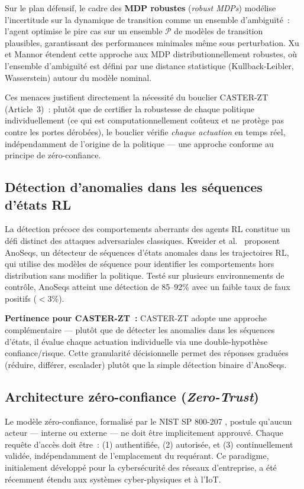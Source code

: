 Sur le plan défensif, le cadre des \textbf{MDP robustes} (\emph{robust MDPs}) \cite{Iyengar2005RobustMDP} modélise l'incertitude sur la dynamique de transition comme un ensemble d'ambiguïté~: l'agent optimise le pire cas sur un ensemble $\mathcal{P}$ de modèles de transition plausibles, garantissant des performances minimales même sous perturbation. Xu et Mannor \cite{Xu2010DistRobustMDP} étendent cette approche aux MDP distributionnellement robustes, où l'ensemble d'ambiguïté est défini par une distance statistique (Kullback-Leibler, Wasserstein) autour du modèle nominal.

Ces menaces justifient directement la nécessité du bouclier CASTER-ZT (Article~3)~: plutôt que de certifier la robustesse de chaque politique individuellement (ce qui est computationnellement coûteux et ne protège pas contre les portes dérobées), le bouclier vérifie \emph{chaque actuation} en temps réel, indépendamment de l'origine de la politique --- une approche conforme au principe de zéro-confiance.

\subsection{Détection d'anomalies dans les séquences d'états RL}\label{sec:revlit-anomaly}

La détection précoce des comportements aberrants des agents RL constitue un défi distinct des attaques adversariales classiques.
Kweider et al.~\cite{anoseqs2024} proposent AnoSeqs, un détecteur de séquences d'états anomales dans les trajectoires RL, qui utilise des modèles de séquence pour identifier les comportements hors distribution sans modifier la politique. Testé sur plusieurs environnements de contrôle, AnoSeqs atteint une détection de 85--92\% avec un faible taux de faux positifs ($<$3\%).

\textbf{Pertinence pour CASTER-ZT~:} CASTER-ZT adopte une approche complémentaire --- plutôt que de détecter les anomalies dans les séquences d'états, il évalue chaque actuation individuelle via une double-hypothèse confiance/risque. Cette granularité décisionnelle permet des réponses graduées (réduire, différer, escalader) plutôt que la simple détection binaire d'AnoSeqs.

\subsection{Architecture zéro-confiance (\emph{Zero-Trust})}

Le modèle zéro-confiance, formalisé par le NIST SP 800-207 \cite{rose2020nist}, postule qu'aucun acteur --- interne ou externe --- ne doit être implicitement approuvé. Chaque requête d'accès doit être~: (1) authentifiée, (2) autorisée, et (3) continuellement validée, indépendamment de l'emplacement du requérant. Ce paradigme, initialement développé pour la cybersécurité des réseaux d'entreprise, a été récemment étendu aux systèmes cyber-physiques et à l'IoT.

